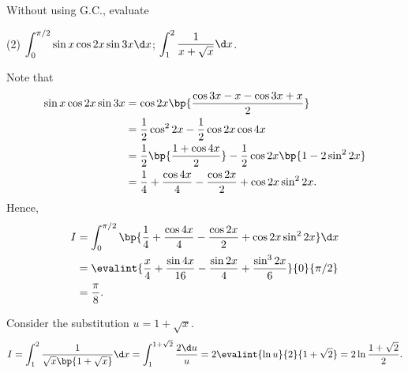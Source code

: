 \begin{problem}
    Without using G.C., evaluate
    \begin{tasks}(2)
        \task $\displaystyle\int_0^{\pi/2} \sin x \cos 2x \sin 3x \d x$;
        \task $\displaystyle\int_1^2 \frac1{x + \sqrt{x}} \d x$.
    \end{tasks}
\end{problem}
\begin{solution}
    \begin{ppart}
        Note that 
        \begin{align*}
            \sin x \cos 2x \sin 3x &= \cos 2x \bp{\frac{\cos{3x - x} - \cos{3x + x}}{2}}\\
            &= \frac12 \cos^2 2x - \frac12 \cos 2x \cos 4x \\
            &= \frac12 \bp{\frac{1 + \cos 4x}{2}} - \frac12 \cos 2x \bp{1 - 2 \sin^2 2x}\\
            &= \frac14 + \frac{\cos 4x}{4} - \frac{\cos 2x}{2} + \cos 2x \sin^2 2x.
        \end{align*}
        Hence,
        \begin{align*}
            I &= \int_0^{\pi/2} \bp{\frac14 + \frac{\cos 4x}{4} - \frac{\cos 2x}{2} + \cos 2x \sin^2 2x} \d x\\
            &= \evalint{\frac{x}4 + \frac{\sin 4x}{16} - \frac{\sin 2x}{4} + \frac{\sin^3 2x}{6}}{0}{\pi/2}\\
            &= \frac\pi8.
        \end{align*}
    \end{ppart}
    \begin{ppart}
        Consider the substitution $u = 1 + \sqrt{x}$. \[I = \int_1^2 \frac1{\sqrt{x} \bp{1 + \sqrt{x}}} \d x = \int_1^{1 + \sqrt2} \frac{2 \d u}{u} = 2 \evalint{\ln u}{2}{1 + \sqrt2} = 2\ln \frac{1 + \sqrt 2}2.\]
    \end{ppart}
\end{solution}

